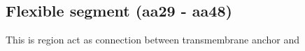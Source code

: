 \subsection{Flexible segment (aa29 - aa48)}

This is region act as connection between transmembrane anchor and 

